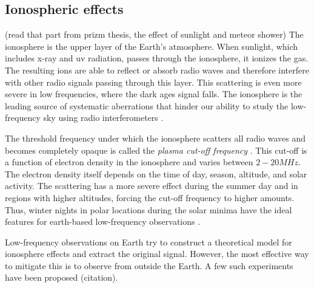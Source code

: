 \documentclass[12pt, TexShade, letterpaper]{report}
\begin{document}
\subsection{Ionospheric effects}
(read that part from prizm thesis, the effect of sunlight and meteor shower)
The ionosphere is the upper layer of the Earth's atmosphere. When sunlight, which includes x-ray and \gls{uv} radiation, passes through the ionosphere, it ionizes the gas. The resulting ions are able to reflect or absorb radio waves and therefore interfere with other radio signals passing through this layer. This scattering is even more severe in low frequencies, where the dark ages signal falls. The ionosphere is the leading source of systematic aberrations that hinder our ability to study the low-frequency sky using radio interferometers \cite{thesis_pamela, ionosphere_ultra_low}.\par
The threshold frequency under which the ionosphere scatters all radio waves and becomes completely opaque is called the \emph{plasma cut-off frequency} \cite{ionosphere_effect_book, thesis_pamela}. This cut-off is a function of electron density in the ionosphere and varies between $2-20MHz$. The electron density itself depends on the time of day, season, altitude, and solar activity. The scattering has a more severe effect during the summer day and in regions with higher altitudes, forcing the cut-off frequency to higher amounts. Thus, winter nights in polar locations during the solar minima have the ideal features for earth-based low-frequency observations \cite{thesis_pamela}.\par
Low-frequency observations on Earth try to construct a theoretical model for ionosphere effects and extract the original signal. However, the most effective way to mitigate this is to observe from outside the Earth\cite{thesis_shedding}. A few such experiments have been proposed (citation). \par
\end{document}
